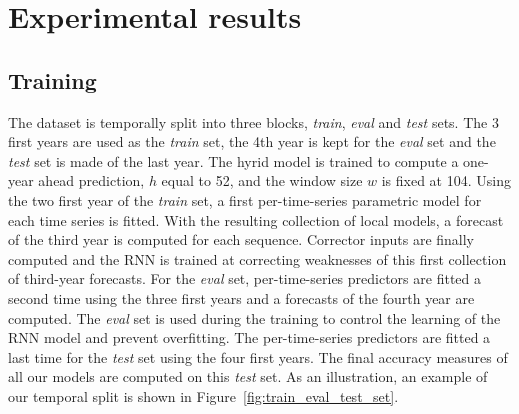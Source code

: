 \documentclass{article} %
\newcommand{\lag}{h}
\newcommand{\window}{w}
\begin{document}
\section{Experimental results}
\label{sec:exp}

\subsection{Training}

The dataset is temporally split into three blocks, {\em train}, {\em eval} and {\em test} sets. The 3 first years are used as the {\em train} set, the 4th year is kept for the {\em eval} set and the {\em test} set is made of the last year. The hyrid model is trained to compute a one-year ahead prediction, $\lag$ equal to 52, and the window size $\window$ is fixed at 104.
Using the two first year of the {\em train} set, a first per-time-series parametric model for each time series is fitted. With the resulting collection of local models, a forecast of the third year is computed for each sequence. Corrector inputs are finally computed and the RNN is trained at correcting weaknesses of this first collection of third-year forecasts. For the {\em eval} set, per-time-series predictors are fitted a second time using the three first years and a forecasts of the fourth year are computed. The {\em eval} set is used during the training to control the learning of the RNN model and prevent overfitting. The per-time-series predictors are fitted a last time for the {\em test} set using the four first years. The final accuracy measures of all our models are computed on this {\em test} set. As an illustration, an example of our temporal split is shown in Figure~\ref{fig:train_eval_test_set}.

\end{document}
